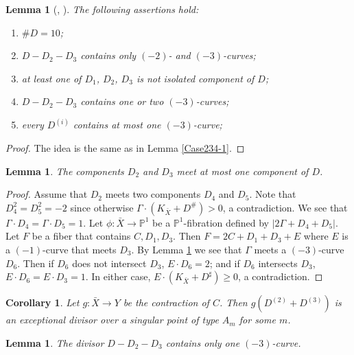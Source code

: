 \documentclass[10pt,oneside,reqno]{amsart}
\newcommand{\pp}{\mathbb{P}}
\newtheorem{lemma}[theorem]{Lemma}
\newtheorem{corollary}[theorem]{Corollary}
\theoremstyle{definition}
\theoremstyle{remark}
\numberwithin{equation}{section}
\begin{document}
\begin{lemma}[{\cite{GZ}, \cite{KT}}]
\label{Case233-1} The following assertions hold:
\begin{enumerate}
\item $\#D=10$;
\item $D-D_2-D_3$ contains only $(-2)$- and $(-3)$-curves;
\item at least one of $D_1$, $D_2$, $D_3$ is not isolated component of $D$;
\item $D-D_2-D_3$ contains one or two $(-3)$-curves;
\item every $D^{(i)}$ contains at most one $(-3)$-curve;
\end{enumerate}
\end{lemma}

\begin{proof}
The idea is the same as in Lemma \ref{Case234-1}.
\end{proof}

\begin{lemma}
\label{Case233-2}
The components $D_2$ and $D_3$ meet at most one component of $D$.
\end{lemma}

\begin{proof}
Assume that $D_2$ meets two components $D_4$ and $D_5$. Note that $D_4^2=D_5^2=-2$ since otherwise $\Gamma \cdot (K_{\bar{X}}+D^\#) > 0$, a contradiction. We see that $\Gamma\cdot D_4=\Gamma\cdot D_5=1$. Let $\phi\colon\bar{X}\rightarrow\pp^1$ be a $\pp^1$-fibration defined by $|2\Gamma+D_4+D_5|$. Let $F$ be a fiber that contains $C, D_1, D_3$. Then $F=2C+D_1+D_3+E$ where $E$ is a $(-1)$-curve that meets $D_3$. By Lemma \ref{Case233-1} we see that $\Gamma$ meets a $(-3)$-curve $D_6$. Then if
$D_6$ does not intersect $D_3$, $E\cdot D_6=2$; and if $D_6$ intersects $D_3$,  $E\cdot D_6 = E \cdot D_3 = 1$. In either case, $E\cdot(K_{\bar{X}}+D^{\sharp})\geq 0$, a contradiction.
\end{proof}

\begin{corollary}
\label{Case233-3}
Let $g\colon\bar{X}\rightarrow Y$ be the contraction of $C$. Then $g(D^{(2)}+D^{(3)})$ is an exceptional divisor over a singular point of type $A_m$ for some $m$.
\end{corollary}


\begin{lemma}
\label{Case233-4}
The divisor $D-D_2-D_3$ contains only one $(-3)$-curve.
\end{lemma}
\end{document}
